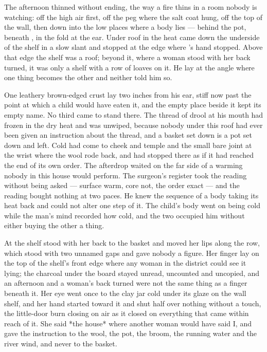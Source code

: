The afternoon thinned without ending, the way a fire thins in a room nobody is watching: off the high air first, off the peg where the salt coat hung, off the top of the wall, then down into the low places where a body lies --- behind the pot, beneath , in the fold at the ear. Under  roof in  the heat came down the underside of the shelf in a slow slant and stopped at the edge where 's hand stopped. Above that edge the shelf was a roof; beyond it, where a woman stood with her back turned, it was only a shelf with a row of loaves on it. He lay at the angle where one thing becomes the other and neither told him so.

One leathery brown-edged crust lay two inches from his ear, stiff now past the point at which a child would have eaten it, and the empty place beside it kept its empty name. No third came to stand there. The thread of drool at his mouth had frozen in the dry heat and was unwiped, because nobody under this roof had ever been given an instruction about the thread, and a basket set down is a pot set down and left. Cold had come to cheek and temple and the small bare joint at the wrist where the wool rode back, and had stopped there as if it had reached the end of its own order. The afterdrop waited on the far side of a warming nobody in this house would perform. The surgeon's register took the reading without being asked --- surface warm, core not, the order exact --- and the reading bought nothing at two paces. He knew the sequence of a body taking its heat back and could not alter one step of it. The child's body went on being cold while the man's mind recorded how cold, and the two occupied him without either buying the other a thing.

\scenebreak

At the shelf  stood with her back to the basket and moved her lips along the row, which stood with two unnamed gaps and gave nobody a figure. Her finger lay on the top of the shelf's front edge where any woman in the district could see it lying; the charcoal under the board stayed unread, uncounted and uncopied, and an afternoon and a woman's back turned were not the same thing as a finger beneath it. Her eye went once to the clay jar cold under its glaze on the wall shelf, and her hand started toward it and shut half over nothing without a touch, the little-door burn closing on air as it closed on everything that came within reach of it. She said *the house* where another woman would have said I, and gave the instruction to the wool, the pot, the broom, the running water and the river wind, and never to the basket.

